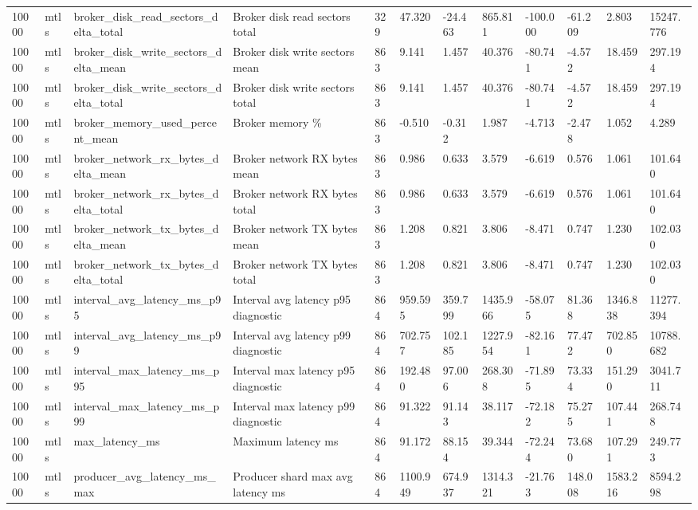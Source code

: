 \begin{longtable}{llllllllllll}
10000 & mtls & broker\_disk\_read\_sectors\_delta\_total & Broker disk read sectors total & 329 & 47.320 & -24.463 & 865.811 & -100.000 & -61.209 & 2.803 & 15247.776 \\
10000 & mtls & broker\_disk\_write\_sectors\_delta\_mean & Broker disk write sectors mean & 863 & 9.141 & 1.457 & 40.376 & -80.741 & -4.572 & 18.459 & 297.194 \\
10000 & mtls & broker\_disk\_write\_sectors\_delta\_total & Broker disk write sectors total & 863 & 9.141 & 1.457 & 40.376 & -80.741 & -4.572 & 18.459 & 297.194 \\
10000 & mtls & broker\_memory\_used\_percent\_mean & Broker memory \% & 863 & -0.510 & -0.312 & 1.987 & -4.713 & -2.478 & 1.052 & 4.289 \\
10000 & mtls & broker\_network\_rx\_bytes\_delta\_mean & Broker network RX bytes mean & 863 & 0.986 & 0.633 & 3.579 & -6.619 & 0.576 & 1.061 & 101.640 \\
10000 & mtls & broker\_network\_rx\_bytes\_delta\_total & Broker network RX bytes total & 863 & 0.986 & 0.633 & 3.579 & -6.619 & 0.576 & 1.061 & 101.640 \\
10000 & mtls & broker\_network\_tx\_bytes\_delta\_mean & Broker network TX bytes mean & 863 & 1.208 & 0.821 & 3.806 & -8.471 & 0.747 & 1.230 & 102.030 \\
10000 & mtls & broker\_network\_tx\_bytes\_delta\_total & Broker network TX bytes total & 863 & 1.208 & 0.821 & 3.806 & -8.471 & 0.747 & 1.230 & 102.030 \\
10000 & mtls & interval\_avg\_latency\_ms\_p95 & Interval avg latency p95 diagnostic & 864 & 959.595 & 359.799 & 1435.966 & -58.075 & 81.368 & 1346.838 & 11277.394 \\
10000 & mtls & interval\_avg\_latency\_ms\_p99 & Interval avg latency p99 diagnostic & 864 & 702.757 & 102.185 & 1227.954 & -82.161 & 77.472 & 702.850 & 10788.682 \\
10000 & mtls & interval\_max\_latency\_ms\_p95 & Interval max latency p95 diagnostic & 864 & 192.480 & 97.006 & 268.308 & -71.895 & 73.334 & 151.290 & 3041.711 \\
10000 & mtls & interval\_max\_latency\_ms\_p99 & Interval max latency p99 diagnostic & 864 & 91.322 & 91.143 & 38.117 & -72.182 & 75.275 & 107.441 & 268.748 \\
10000 & mtls & max\_latency\_ms & Maximum latency ms & 864 & 91.172 & 88.154 & 39.344 & -72.244 & 73.680 & 107.291 & 249.773 \\
10000 & mtls & producer\_avg\_latency\_ms\_max & Producer shard max avg latency ms & 864 & 1100.949 & 674.937 & 1314.321 & -21.763 & 148.008 & 1583.216 & 8594.298 \\

\end{longtable}
